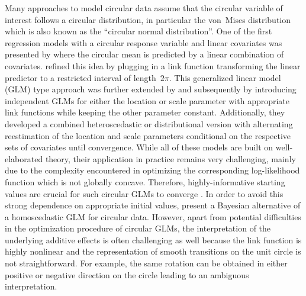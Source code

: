 \documentclass[nojss,shortnames]{jss}
\numberwithin{equation}{section}
\begin{document}
Many approaches to model circular data assume that the circular variable of
interest follows a circular distribution, in particular the von~Mises
distribution which is also known as the ``circular normal distribution''. One
of the first regression models with a circular response variable and linear
covariates was presented by \cite{Gould:1969} where the circular mean is
predicted by a linear combination of covariates. \cite{Johnson+Wehrly:1978}
refined this idea by plugging in a link function transforming the linear
predictor to a restricted interval of length~$2\pi$. This generalized linear
model (GLM) type approach was further extended by \cite{Fisher+Lee:1992} and
subsequently by \cite{Fisher:1993} introducing independent GLMs for either the
location or scale parameter with appropriate link functions while keeping the
other parameter constant. Additionally, they developed a combined
heteroscedastic or distributional version with alternating reestimation of the
location and scale parameters conditional on the respective sets of covariates
until convergence. While all of these models are built on well-elaborated
theory, their application in practice remains very challenging, mainly due to
the complexity encountered in optimizing the corresponding log-likelihood
function which is not globally concave. Therefore, highly-informative starting
values are crucial for such circular GLMs to converge
\citep{Pewsey+Neuhaeuser+Ruxton:2013, Gill+Hangartner:2010}. In order to avoid
this strong dependence on appropriate initial values,
\cite{Mulder+Klugkist:2017} present a Bayesian alternative of a homoscedastic
GLM for circular data. However, apart from potential difficulties in the
optimization procedure of circular GLMs, the interpretation of the underlying
additive effects is often challenging as well because the link function is
highly nonlinear and the representation of smooth transitions on the unit
circle is not straightforward. For example, the same rotation can be obtained
in either positive or negative direction on the circle leading to an ambiguous
interpretation.
\end{document}
